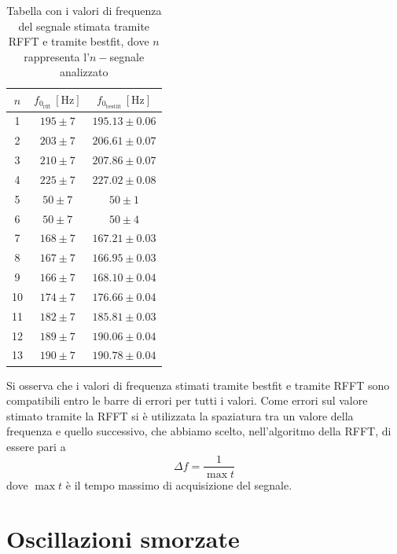 \documentclass{article}
\begin{document}
\begin{table}[H]
    \centering
    \begin{tabular}{c c c}
        \toprule
        $n$ & $f_{0_\text{rfft}} \, [\text{Hz}]$ & $f_{0_\text{bestfit}} \, [\text{Hz}]$ \\
        \midrule
        1 & $195 \pm 7$         & $195.13 \pm 0.06$ \\
        2 & $203 \pm 7$       & $206.61 \pm 0.07$ \\
        3 & $210 \pm 7$         & $207.86 \pm 0.07$ \\
        4 & $225 \pm 7$         & $227.02 \pm 0.08$ \\
        5 & $50 \pm 7$          & $50 \pm 1$ \\
        6 & $50 \pm 7$          & $50 \pm 4$ \\
        7 & $168 \pm 7$         & $167.21 \pm 0.03$ \\
        8 & $167 \pm 7$         & $166.95 \pm 0.03$ \\
        9 & $166 \pm 7$         & $168.10 \pm 0.04$ \\
        10 & $174 \pm 7$        & $176.66 \pm 0.04$ \\
        11 & $182 \pm 7$        & $185.81 \pm 0.03$ \\
        12 & $189 \pm 7$        & $190.06 \pm 0.04$ \\
        13 & $190 \pm 7$        & $190.78 \pm 0.04$ \\
        \bottomrule
    \end{tabular}
    \caption{Tabella con i valori di frequenza del segnale stimata tramite RFFT e tramite bestfit, dove $n$ rappresenta l'$n-$segnale analizzato}
    \label{tab:cft_rfft_bestfit}
\end{table}
Si osserva che i valori di frequenza stimati tramite bestfit e tramite RFFT sono compatibili entro le barre di errori per tutti i valori. Come errori sul valore stimato tramite la RFFT si è utilizzata la spaziatura tra un valore della frequenza e quello successivo, che abbiamo scelto, nell'algoritmo della RFFT, di essere pari a 
$$
    \Delta f = \frac{1}{\max{t}}
$$
dove $\max{t}$ è il tempo massimo di acquisizione del segnale. 
\section{Oscillazioni smorzate}
\end{document}
